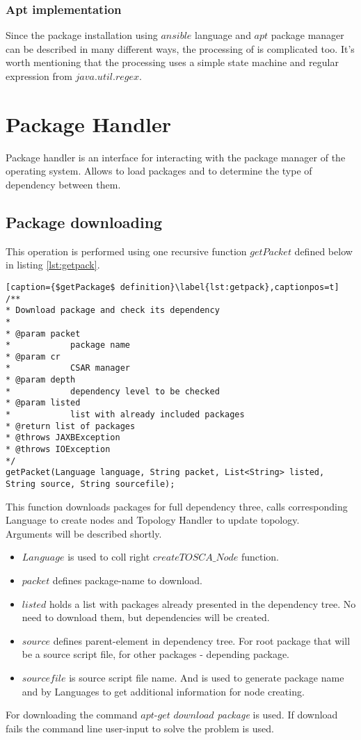 \subsubsection*{Apt implementation}
Since the package installation using $ansible$ language and $apt$ package manager can be described in many different ways, the processing of is complicated too.
It's worth mentioning that the processing uses a simple state machine and regular expression from $java$.$util$.$regex$.

\section{Package Handler}
Package handler is an interface for interacting with the package manager of the operating system.
Allows to load packages and to determine the type of dependency between them.

\subsection*{Package downloading}
This operation is performed using one recursive function $getPacket$ defined below in listing \ref{lst:getpack}.
\begin{lstlisting}[caption={$getPackage$ definition}\label{lst:getpack},captionpos=t]
/**
* Download package and check its dependency
* 
* @param packet
*            package name
* @param cr
*            CSAR manager
* @param depth
*            dependency level to be checked
* @param listed
*            list with already included packages
* @return list of packages
* @throws JAXBException
* @throws IOException
*/
getPacket(Language language, String packet, List<String> listed, String source, String sourcefile);
\end{lstlisting}
This function downloads packages for full dependency three, calls corresponding Language to create nodes and Topology Handler to update topology.\\
Arguments will be described shortly.
\begin{itemize}
	\item $Language$ is used to coll right $createTOSCA\_Node$ function.
	\item $packet$ defines package-name to download.
	\item $listed$ holds a list with packages already presented in the dependency tree. No need to download them, but dependencies will be created.
	\item $source$ defines parent-element in dependency tree. For root package that will be a source script file, for other packages - depending package.
	\item $sourcefile$ is source script file name. And is used to generate package name and by Languages to get additional information for node creating. 
\end{itemize}
For downloading the command $apt$-$get$ $download$ \emph{package} is used. 
If download fails the command line user-input to solve the problem is used. 

